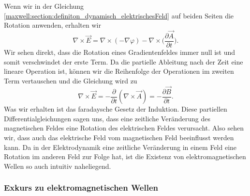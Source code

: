 Wenn wir in der Gleichung \eqref{maxwell:section:definiton_dynamisch_elektrischesFeld} auf beiden Seiten die Rotation anwenden, erhalten wir
\[
\nabla \times \vec{E}
=
\nabla \times \left(- \nabla \varphi\right) - \nabla \times \biggl(\frac{\partial \vec{A}}{\partial t}\biggr).
\]
Wir sehen direkt, dass die Rotation eines Gradientenfeldes immer null ist und somit verschwindet der erste Term.
Da die partielle Ableitung nach der Zeit eine lineare Operation ist, können wir die Reihenfolge der Operationen im zweiten Term vertauschen und die Gleichung wird zu
\begin{equation}
\nabla \times \vec{E}
=
- \frac{\partial}{\partial t} (\nabla \times \vec{A})
=
- \frac{\partial \vec{B}}{\partial t}.
\end{equation}
Was wir erhalten ist das faradaysche Gesetz der Induktion.
Diese partiellen Differentialgleichungen sagen uns, dass eine zeitliche Veränderung des magnetischen Feldes eine Rotation des elektrischen Feldes verursacht. Also sehen wir, dass auch das elektrische Feld vom magnetischen Feld beeinflusst werden kann. Da in der Elektrodynamik eine zeitliche Veränderung in einem Feld eine Rotation im anderen Feld zur Folge hat, ist die Existenz von elektromagnetischen Wellen so auch intuitiv naheliegend. 


\subsubsection{Exkurs zu elektromagnetischen Wellen}


